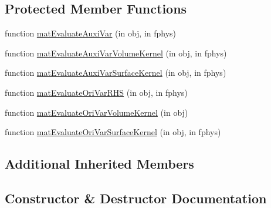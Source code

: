 \subsection*{Protected Member Functions}
\begin{DoxyCompactItemize}
\item 
function \hyperlink{class_ndg_quad_free_strong_central_vis_solver2d_a91ad9a30a20d0f2c5e800264526f1ebe}{mat\+Evaluate\+Auxi\+Var} (in obj, in fphys)
\item 
function \hyperlink{class_ndg_quad_free_strong_central_vis_solver2d_a4d3f397a14a957ea28f13088b447cb5a}{mat\+Evaluate\+Auxi\+Var\+Volume\+Kernel} (in obj, in fphys)
\item 
function \hyperlink{class_ndg_quad_free_strong_central_vis_solver2d_a8fde451523c2943847fe6d07e0b94d5d}{mat\+Evaluate\+Auxi\+Var\+Surface\+Kernel} (in obj, in fphys)
\item 
function \hyperlink{class_ndg_quad_free_strong_central_vis_solver2d_a8fc1f13cf5e004d2b0eec2c15ee30cd5}{mat\+Evaluate\+Ori\+Var\+R\+HS} (in obj, in fphys)
\item 
function \hyperlink{class_ndg_quad_free_strong_central_vis_solver2d_ae642626bed054f7a4109f679ddf4d448}{mat\+Evaluate\+Ori\+Var\+Volume\+Kernel} (in obj)
\item 
function \hyperlink{class_ndg_quad_free_strong_central_vis_solver2d_a21231cbba51336f0b65de6ccda106109}{mat\+Evaluate\+Ori\+Var\+Surface\+Kernel} (in obj, in fphys)
\end{DoxyCompactItemize}
\subsection*{Additional Inherited Members}


\subsection{Constructor \& Destructor Documentation}
\mbox{\label{class_ndg_quad_free_strong_central_vis_solver2d_a1c371c75c299f0a2767c9980ca1e5caf}} 
